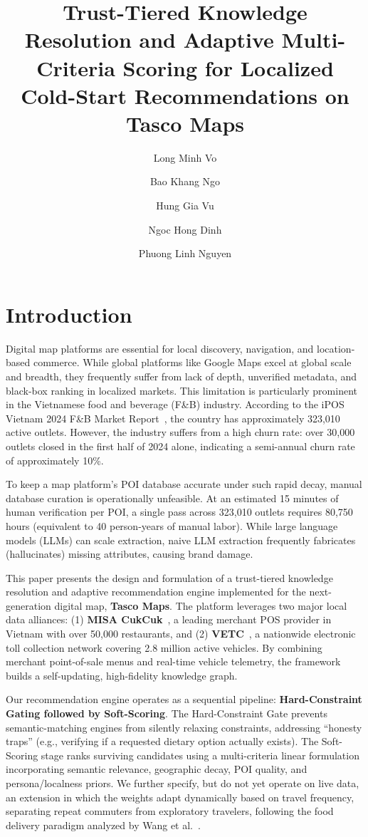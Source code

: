 \documentclass[acmsmall,screen]{acmart}
\title{\textbf{Trust-Tiered Knowledge Resolution and Adaptive Multi-Criteria Scoring for Localized Cold-Start Recommendations on Tasco Maps}}
\author{Long Minh Vo}
\affiliation{%
  \institution{RMIT University Vietnam}
  \city{Ho Chi Minh City}
  \country{Vietnam}
}
\author{Bao Khang Ngo}
\affiliation{%
  \institution{Ben Tre High School for Gifted Students}
  \city{Vinh Long}
  \country{Vietnam}
}
\author{Hung Gia Vu}
\affiliation{%
  \institution{RMIT University Vietnam}
  \city{Ho Chi Minh City}
  \country{Vietnam}
}
\author{Ngoc Hong Dinh}
\affiliation{%
  \institution{Fulbright University Vietnam}
  \city{Ho Chi Minh City}
  \country{Vietnam}
}
\author{Phuong Linh Nguyen}
\affiliation{%
  \institution{Minerva University}
  \city{San Francisco}
  \country{United States of America}
}
\date{}
\begin{document}
\maketitle

\section{Introduction}
Digital map platforms are essential for local discovery, navigation, and location-based commerce. While global platforms like Google Maps excel at global scale and breadth, they frequently suffer from lack of depth, unverified metadata, and black-box ranking in localized markets. This limitation is particularly prominent in the Vietnamese food and beverage (F\&B) industry. According to the iPOS Vietnam 2024 F\&B Market Report~\cite{ipos2024report}, the country has approximately 323,010 active outlets. However, the industry suffers from a high churn rate: over 30,000 outlets closed in the first half of 2024 alone, indicating a semi-annual churn rate of approximately 10\%.

To keep a map platform's POI database accurate under such rapid decay, manual database curation is operationally unfeasible. At an estimated 15 minutes of human verification per POI, a single pass across 323,010 outlets requires 80,750 hours (equivalent to 40 person-years of manual labor). While large language models (LLMs) can scale extraction, naive LLM extraction frequently fabricates (hallucinates) missing attributes, causing brand damage.

This paper presents the design and formulation of a trust-tiered knowledge resolution and adaptive recommendation engine implemented for the next-generation digital map, \textbf{Tasco Maps}. The platform leverages two major local data alliances: (1) \textbf{MISA CukCuk}~\cite{misacukcuk}, a leading merchant POS provider in Vietnam with over 50,000 restaurants, and (2) \textbf{VETC}~\cite{vetctoll}, a nationwide electronic toll collection network covering 2.8 million active vehicles. By combining merchant point-of-sale menus and real-time vehicle telemetry, the framework builds a self-updating, high-fidelity knowledge graph.

Our recommendation engine operates as a sequential pipeline: \textbf{Hard-Constraint Gating followed by Soft-Scoring}. The Hard-Constraint Gate prevents semantic-matching engines from silently relaxing constraints, addressing ``honesty traps'' (e.g., verifying if a requested dietary option actually exists). The Soft-Scoring stage ranks surviving candidates using a multi-criteria linear formulation incorporating semantic relevance, geographic decay, POI quality, and persona/localness priors. We further specify, but do not yet operate on live data, an extension in which the weights adapt dynamically based on travel frequency, separating repeat commuters from exploratory travelers, following the food delivery paradigm analyzed by Wang et al.~\cite{wang2024righttool}.
\end{document}
